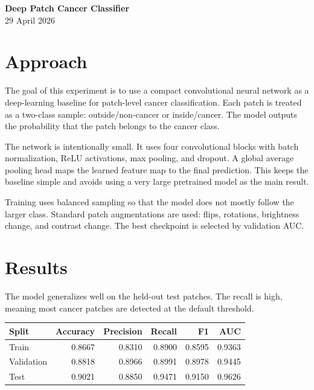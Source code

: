 \documentclass[10pt]{article}
\begin{document}
\small

\begin{center}
{\Large \textbf{Deep Patch Cancer Classifier}}\\
29 April 2026
\end{center}

\section*{Approach}

The goal of this experiment is to use a compact convolutional neural network as a deep-learning baseline for patch-level cancer classification. Each patch is treated as a two-class sample: outside/non-cancer or inside/cancer. The model outputs the probability that the patch belongs to the cancer class.

The network is intentionally small. It uses four convolutional blocks with batch normalization, ReLU activations, max pooling, and dropout. A global average pooling head maps the learned feature map to the final prediction. This keeps the baseline simple and avoids using a very large pretrained model as the main result.

Training uses balanced sampling so that the model does not mostly follow the larger class. Standard patch augmentations are used: flips, rotations, brightness change, and contrast change. The best checkpoint is selected by validation AUC.

\section*{Results}

The model generalizes well on the held-out test patches. The recall is high, meaning most cancer patches are detected at the default threshold.

\begin{center}
\begin{tabular}{lrrrrr}
\toprule
\textbf{Split} & \textbf{Accuracy} & \textbf{Precision} & \textbf{Recall} & \textbf{F1} & \textbf{AUC} \\
\midrule
Train & 0.8667 & 0.8310 & 0.8900 & 0.8595 & 0.9363 \\
Validation & 0.8818 & 0.8966 & 0.8991 & 0.8978 & 0.9445 \\
Test & 0.9021 & 0.8850 & 0.9471 & 0.9150 & 0.9626 \\
\bottomrule
\end{tabular}
\end{center}
\end{document}
